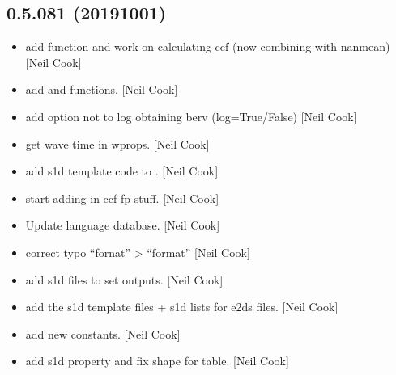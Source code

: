 \documentclass[a4paper,10pt,english]{report}
\begin{document}
\subsection{0.5.081 (2019\sphinxhyphen{}10\sphinxhyphen{}01)}
\label{\detokenize{misc/changelog:id80}}\begin{itemize}
\item {} 
 \sphinxhyphen{} add  function and
work on calculating ccf (now combining with nanmean) {[}Neil Cook{]}

\item {} 
 \sphinxhyphen{} add  and
 functions. {[}Neil Cook{]}

\item {} 
 \sphinxhyphen{} add option not to log obtaining berv
(log=True/False) {[}Neil Cook{]}

\item {} 
 \sphinxhyphen{} get wave time in wprops. {[}Neil Cook{]}

\item {} 
 \sphinxhyphen{} add s1d template code to
. {[}Neil Cook{]}

\item {} 
 \sphinxhyphen{} start adding in ccf fp stuff. {[}Neil
Cook{]}

\item {} 
Update language database. {[}Neil Cook{]}

\item {} 
 \sphinxhyphen{} correct typo “fornat” \textendash{}\textgreater{} “format” {[}Neil Cook{]}

\item {} 
 \sphinxhyphen{} add s1d files to set
outputs. {[}Neil Cook{]}

\item {} 
 \sphinxhyphen{} add the s1d template
files + s1d lists for e2ds files. {[}Neil Cook{]}

\item {} 
 \sphinxhyphen{} add new 
constants. {[}Neil Cook{]}

\item {} 
 \sphinxhyphen{} add s1d property and fix shape for table.
{[}Neil Cook{]}

\end{itemize}
\end{document}
